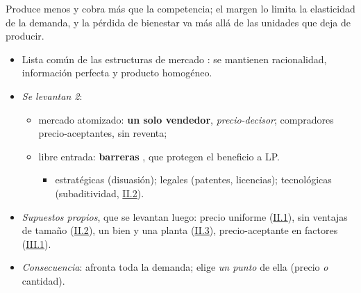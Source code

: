 \documentclass{article}
\begin{document}
\begin{columnas}
\begin{ideaclave}
Produce menos y cobra más que la competencia; el margen lo limita la elasticidad de la demanda, y la pérdida de bienestar va más allá de las unidades que deja de producir.
\end{ideaclave}

\begin{itemize}
\item Lista común de las estructuras de mercado : se mantienen racionalidad, información perfecta y producto homogéneo.
\item \emph{Se levantan 2}:
  \begin{itemize}
  \item mercado atomizado: \textbf{un solo vendedor}, \emph{precio-decisor}; compradores precio-aceptantes, sin reventa;
  \item libre entrada: \textbf{barreras} , que protegen el beneficio a LP.
    \begin{itemize}
    \item estratégicas (disuasión); legales (patentes, licencias); tecnológicas (subaditividad, \hyperref[rep:II.2]{II.2}).
    \end{itemize}
  \end{itemize}
\item \emph{Supuestos propios}, que se levantan luego: precio uniforme (\hyperref[rep:II.1]{II.1}), sin ventajas de tamaño (\hyperref[rep:II.2]{II.2}), un bien y una planta (\hyperref[rep:II.3]{II.3}), precio-aceptante en factores (\hyperref[rep:III.1]{III.1}).
\item \emph{Consecuencia}: afronta toda la demanda; elige \emph{un punto} de ella (precio \emph{o} cantidad).
\end{itemize}


\end{columnas}
\end{document}
